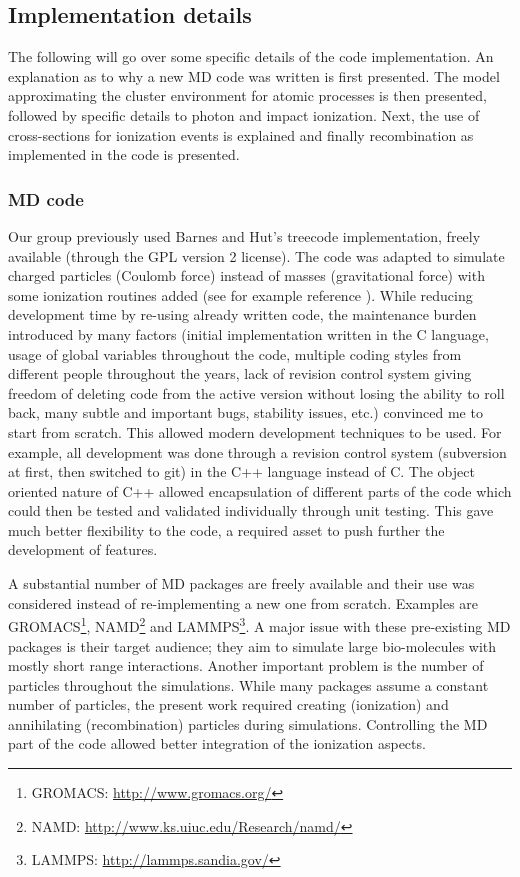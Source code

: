 \subsection{Implementation details}

The following will go over some specific details of the code implementation.
An explanation as to why a new MD code was written is first presented. The
model approximating the cluster environment for atomic processes is then
presented, followed by specific details to photon and impact ionization.
Next, the use of cross-sections for ionization events is explained and finally
recombination as implemented in the code is presented.


\subsubsection{MD code}

Our group previously used Barnes and Hut's treecode implementation,
freely available\cite{treecode} (through the GPL version 2 license). The code was adapted
to simulate charged particles (Coulomb force) instead of masses (gravitational
force) with some ionization routines added (see for example reference
\cite{Jungreuthmayer2005}). While reducing development time by re-using already
written code, the maintenance burden introduced by many factors (initial
implementation written in the C language, usage of global variables
throughout the code, multiple coding styles from different people throughout
the years, lack of revision control system giving freedom
of deleting code from the active version without losing the ability to roll
back, many subtle and important bugs, stability issues, etc.) convinced me
to start from scratch. This allowed modern development techniques to be
used. For example, all development was done through a revision control system
(subversion\cite{svn} at first, then switched to git\cite{git}) in the C++
language instead of C. The object oriented nature of C++ allowed encapsulation
of different parts of the code which could then be tested and validated
individually through unit testing. This gave much better flexibility to the
code, a required asset to
push further the development of features.

A substantial number of MD packages are freely available and
their use was considered instead of re-implementing a new one from scratch.
Examples are GROMACS\footnote{GROMACS:
\url{http://www.gromacs.org/}}, NAMD\footnote{NAMD:
\url{http://www.ks.uiuc.edu/Research/namd/}} and
LAMMPS\footnote{LAMMPS: \url{http://lammps.sandia.gov/}}. A major issue with these
pre-existing MD packages is their target audience; they aim to simulate large
bio-molecules with mostly short range interactions. Another important problem
is the number of particles throughout the simulations. While many packages
assume a constant number of particles, the present work required creating
(ionization) and annihilating (recombination) particles during simulations.
Controlling the MD part of the code allowed better integration of the
ionization aspects.

